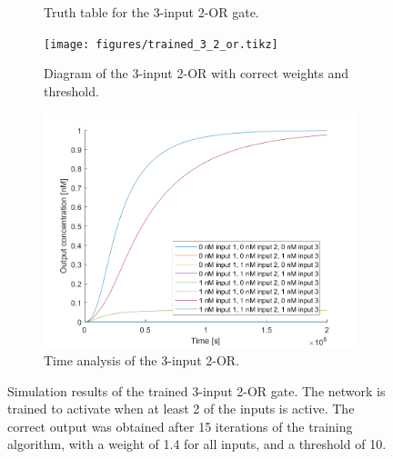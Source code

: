 \begin{figure}[H]
\begin{subfigure}[t]{.49\columnwidth}
\begin{adjustbox}{width=\textwidth}
\begin{tabular}[b]{cccc}
    \hline
    \end{tabular}
  \end{adjustbox}
    \caption{Truth table for the 3-input 2-OR gate.}
    \label{and_table}
\end{subfigure}
\begin{subfigure}[t]{.49\textwidth}
  \texttt{[image: figures/trained\_3\_2\_or.tikz]}
  \caption{Diagram of the 3-input 2-OR with correct weights and threshold.}
\end{subfigure}
\hfill
\begin{subfigure}[t]{\textwidth}
  \centering
\includegraphics[width=\textwidth]{images/or_2_simulation_3input.png}
\caption{Time analysis of the 3-input 2-OR.}
\label{}
\end{subfigure}
\caption{Simulation results of the trained 3-input 2-OR gate. The network is trained to activate when at least 2 of the inputs is active. The correct output was obtained after 15 iterations of the training algorithm, with a weight of 1.4 for all inputs, and a threshold of 10.}
\end{figure}
